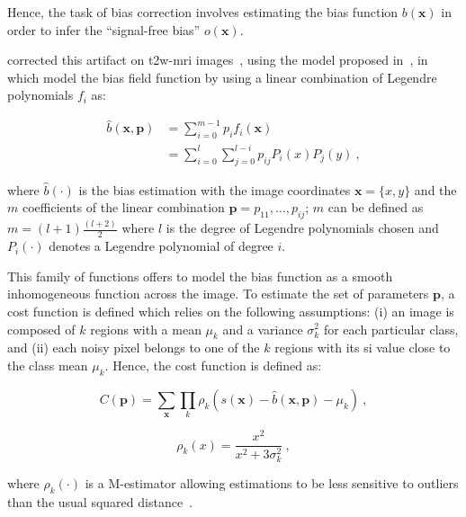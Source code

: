 Hence, the task of bias correction involves estimating the bias function $b(\mathbf{x})$ in order to infer the ``signal-free bias'' $o(\mathbf{x})$.


\citeauthor{Viswanath2009} corrected this artifact on \ac{t2w}-\ac{mri} images~\cite{Viswanath2009}, using the model proposed in~\cite{Styner2000}, in which \citeauthor{Styner2000} model the bias field function by using a linear combination of Legendre polynomials $f_i$ as:

\begin{align}
	\hat{b}(\mathbf{x},\mathbf{p}) & = \sum_{i=0}^{m-1} p_i f_i(\mathbf{x}) \\ \nonumber
                                       & =  \sum_{i=0}^{l} \sum_{j=0}^{l-i} p_{ij} P_i(x) P_j(y) \ ,
	\label{eq:biascorr}
\end{align}

\noindent where $\hat{b}(\cdot)$ is the bias estimation with the image coordinates $\mathbf{x} = \{x,y\}$ and the $m$ coefficients of the linear combination $\mathbf{p} = {p_{11},\dotsc,p_{ij}}$; $m$ can be defined as $m=(l+1)\frac{(l+2)}{2}$ where $l$ is the degree of Legendre polynomials chosen and $P_i(\cdot)$ denotes a Legendre polynomial of degree $i$.

This family of functions offers to model the bias function as a smooth inhomogeneous function across the image.
To estimate the set of parameters $\mathbf{p}$, a cost function is defined which relies on the following assumptions: (i) an image is composed of $k$ regions with a mean $\mu_k$ and a variance $\sigma^{2}_{k}$ for each particular class, and (ii) each noisy pixel belongs to one of the $k$ regions with its \ac{si} value close to the class mean $\mu_k$.
Hence, the cost function is defined as:

\begin{equation}
	C(\mathbf{p}) = \sum_{\mathbf{x}} \prod_{k} \rho_k(s(\mathbf{x}) - \hat{b}(\mathbf{x},\mathbf{p}) - \mu_k) \ ,
	\label{eq:costbias}
\end{equation}

\begin{equation}
	\rho_k(x) = \frac{x^2}{x^2 + 3 \sigma_k^2} \ ,
	\label{eq:mestbias}
\end{equation}

\noindent where $\rho_k(\cdot)$ is a M-estimator allowing estimations to be less sensitive to outliers than the usual squared distance~\cite{Li1996}.

